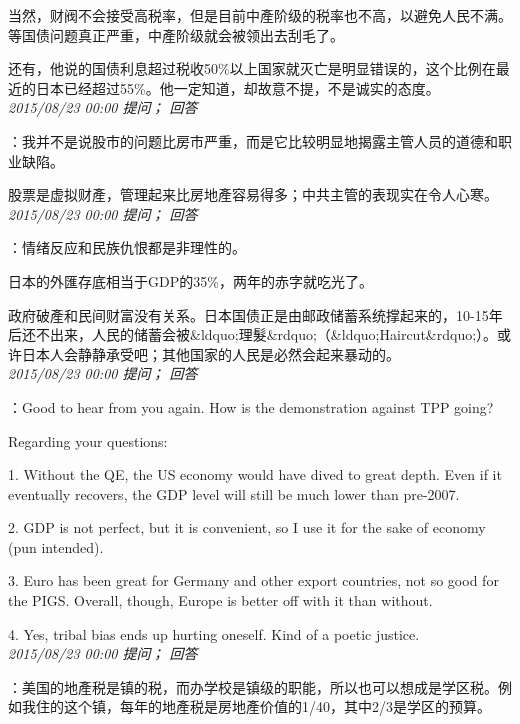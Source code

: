 \documentclass[twocolumn]{ctexart}
\begin{document}
当然，财阀不会接受高税率，但是目前中產阶级的税率也不高，以避免人民不满。等国债问题真正严重，中產阶级就会被领出去刮毛了。

还有，他说的国债利息超过税收50\%以上国家就灭亡是明显错误的，这个比例在最近的日本已经超过55\%。他一定知道，却故意不提，不是诚实的态度。\\

\textit{\hfill\noindent\small 2015/08/23 00:00 提问； 回答}

：我并不是说股市的问题比房市严重，而是它比较明显地揭露主管人员的道德和职业缺陷。

股票是虚拟财產，管理起来比房地產容易得多；中共主管的表现实在令人心寒。\\

\textit{\hfill\noindent\small 2015/08/23 00:00 提问； 回答}

：情绪反应和民族仇恨都是非理性的。

日本的外匯存底相当于GDP的35\%，两年的赤字就吃光了。

政府破產和民间财富没有关系。日本国债正是由邮政储蓄系统撑起来的，10-15年后还不出来，人民的储蓄会被\&ldquo;理髮\&rdquo;（\&ldquo;Haircut\&rdquo;）。或许日本人会静静承受吧；其他国家的人民是必然会起来暴动的。\\

\textit{\hfill\noindent\small 2015/08/23 00:00 提问； 回答}

：Good to hear from you again. How is the demonstration against TPP going?

Regarding your questions:

1. Without the QE, the US economy would have dived to great depth. Even if it eventually recovers, the GDP level will still be much lower than pre-2007.

2. GDP is not perfect, but it is convenient, so I use it for the sake of economy (pun intended).

3. Euro has been great for Germany and other export countries, not so good for the PIGS. Overall, though, Europe is better off with it than without.

4. Yes, tribal bias ends up hurting oneself. Kind of a poetic justice.\\

\textit{\hfill\noindent\small 2015/08/23 00:00 提问； 回答}

：美国的地產税是镇的税，而办学校是镇级的职能，所以也可以想成是学区税。例如我住的这个镇，每年的地產税是房地產价值的1/40，其中2/3是学区的预算。
\end{document}
